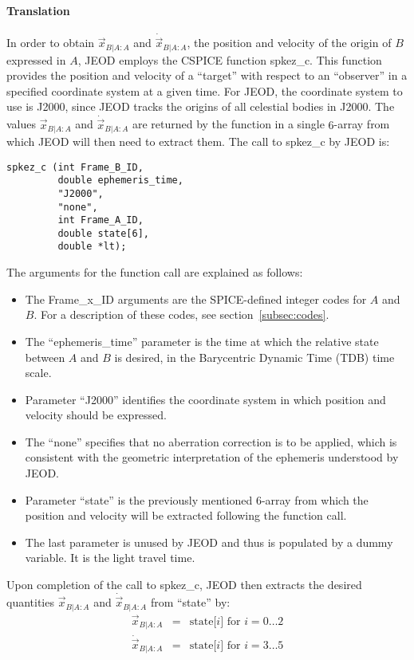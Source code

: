 \paragraph{Translation}
In order to obtain $\vec x_{B|A:A}$ and $\dot{\vec{x}}_{B|A:A}$,
the position and velocity of the origin of $B$ expressed in $A$, JEOD employs
the CSPICE function spkez\_c. This function provides the position and velocity
of a ``target'' with respect to an ``observer'' in a specified coordinate system
at a given time.  For JEOD, the coordinate system to use is J2000, since JEOD
tracks the origins of all celestial bodies in J2000. The values
$\vec x_{B|A:A}$ and $\dot{\vec{x}}_{B|A:A}$ are returned by
the function in a single $6$-array from which JEOD will then need to extract
them.  The call to spkez\_c by JEOD is:
\begin{verbatim}
spkez_c (int Frame_B_ID,
         double ephemeris_time,
         "J2000",
         "none",
         int Frame_A_ID,
         double state[6],
         double *lt);
\end{verbatim}
The arguments for the function call are explained as follows:
\begin{itemize}
\item The Frame\_x\_ID arguments are the SPICE-defined integer codes for $A$
and $B$. For a description of these codes, see section~\ref{subsec:codes}.
\item The ``ephemeris\_time'' parameter is the time at which the relative state
between $A$ and $B$ is desired, in the Barycentric Dynamic Time (TDB) time scale.
\item Parameter ``J2000'' identifies the coordinate system in which position and
velocity should be expressed.
\item The ``none'' specifies that no aberration correction is to be applied, which is
consistent with the geometric interpretation of the ephemeris understood by JEOD.
\item Parameter ``state'' is the previously mentioned $6$-array from which the
position and velocity will be extracted following the function call.
\item The last parameter is unused by JEOD and thus is populated by a dummy
variable. It is the light travel time.
\end{itemize}
Upon completion of the call to spkez\_c, JEOD then extracts the desired quantities
$\vec{x}_{B|A:A}$ and $\dot{\vec{x}}_{B|A:A}$ from ``state'' by:
\begin{eqnarray}
\label{eq:state}
\vec{x}_{B|A:A} & = & \mbox{state[$i$] for }i = 0 \ldots 2 \\ \nonumber
\dot{\vec{x}}_{B|A:A} & = & \mbox{state[$i$] for }i = 3 \ldots 5
\end{eqnarray}

